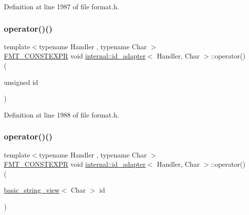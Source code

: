 Definition at line 1987 of file format.\+h.

\mbox{\label{structinternal_1_1id__adapter_a0f76229cd15c8aa66dee599883a672e4}} 
\subsubsection{\texorpdfstring{operator()()}{operator()()}\hspace{0.1cm}{\footnotesize\ttfamily [2/3]}}
{\footnotesize\ttfamily template$<$typename Handler , typename Char $>$ \\
\hyperlink{core_8h_a69201cb276383873487bf68b4ef8b4cd}{F\+M\+T\+\_\+\+C\+O\+N\+S\+T\+E\+X\+PR} void \hyperlink{structinternal_1_1id__adapter}{internal\+::id\+\_\+adapter}$<$ Handler, Char $>$\+::operator() (\begin{DoxyParamCaption}\item[{unsigned}]{id }\end{DoxyParamCaption})\hspace{0.3cm}{\ttfamily [inline]}}



Definition at line 1988 of file format.\+h.

\mbox{\label{structinternal_1_1id__adapter_a9e046831c2198e748c7d9cf56991ef2d}} 
\subsubsection{\texorpdfstring{operator()()}{operator()()}\hspace{0.1cm}{\footnotesize\ttfamily [3/3]}}
{\footnotesize\ttfamily template$<$typename Handler , typename Char $>$ \\
\hyperlink{core_8h_a69201cb276383873487bf68b4ef8b4cd}{F\+M\+T\+\_\+\+C\+O\+N\+S\+T\+E\+X\+PR} void \hyperlink{structinternal_1_1id__adapter}{internal\+::id\+\_\+adapter}$<$ Handler, Char $>$\+::operator() (\begin{DoxyParamCaption}\item[{\hyperlink{classbasic__string__view}{basic\+\_\+string\+\_\+view}$<$ Char $>$}]{id }\end{DoxyParamCaption})\hspace{0.3cm}{\ttfamily [inline]}}



